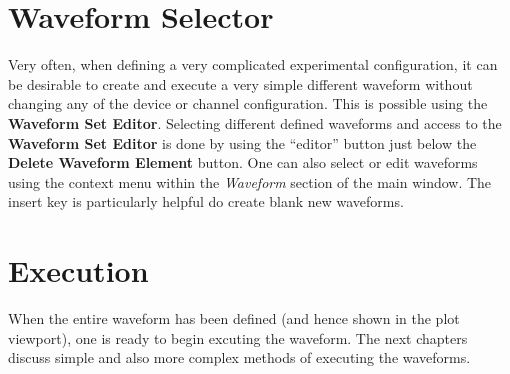 \section{Waveform Selector}
Very often, when defining a very complicated experimental configuration, it can
be desirable to create and execute a very simple different waveform without
changing any of the device or channel configuration.  This is possible using the
\textbf{Waveform Set Editor}.  Selecting different defined waveforms and access
to the \textbf{Waveform Set Editor} is done by using the ``editor'' button just
below the \textbf{Delete Waveform Element} button.  One can also select or edit
waveforms using the context menu within the \textit{Waveform} section of the
main window.  The insert key is particularly helpful do create blank new waveforms.


\section{Execution}
When the entire waveform has been defined (and hence shown in the plot
viewport), one is ready to begin excuting the waveform.  The next chapters
discuss simple and also more complex methods of executing the waveforms.
